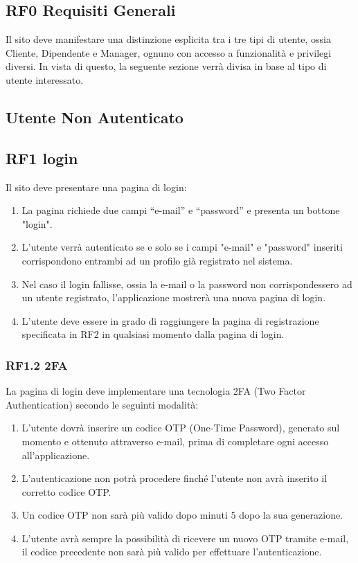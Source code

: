 \documentclass{report}
\begin{document}
\subsection*{RF0 Requisiti Generali}
Il sito deve manifestare una distinzione esplicita tra i tre tipi di utente, ossia Cliente, Dipendente e Manager, ognuno con accesso a funzionalità e privilegi diversi.
In vista di questo, la seguente sezione verrà divisa in base al tipo di utente interessato.

\subsection{Utente Non Autenticato}

\subsection*{RF1 login}
Il sito deve presentare una pagina di login:
\begin{enumerate}
	\item La pagina richiede due campi “e-mail” e “password” e presenta un bottone "login".
	
	\item L'utente verrà autenticato se e solo se i campi "e-mail" e "password" inseriti corrispondono entrambi ad un profilo già registrato nel sistema.
	
	\item Nel caso il login fallisse, ossia la e-mail o la password non corrispondessero ad un utente registrato, l’applicazione mostrerà una nuova pagina di login.
	
	\item L’utente deve essere in grado di raggiungere la pagina di registrazione specificata in RF2 in qualsiasi momento dalla pagina di login.
	
\end{enumerate}

	\subsubsection{RF1.2 2FA}
	La pagina di login deve implementare una tecnologia 2FA (Two Factor Authentication) secondo le seguinti modalità:
	
	\begin{enumerate}
	\item L’utente dovrà inserire un codice OTP (One-Time Password), generato sul momento e ottenuto attraverso e-mail, prima di completare ogni accesso all’applicazione. 
	
	\item 	L’autenticazione non potrà procedere finché l’utente non avrà inserito il corretto codice OTP.
	
	\item Un codice OTP non sarà più valido dopo minuti 5 dopo la sua generazione.
	
	\item L’utente avrà sempre la possibilità di ricevere un nuovo OTP tramite e-mail, il codice precedente non sarà più valido per effettuare l’autenticazione.

	\end{enumerate}
	
\end{document}
